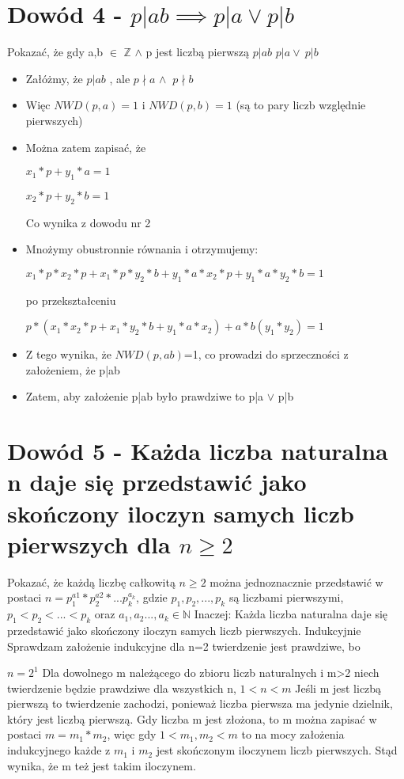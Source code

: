 \documentclass[a4paper, 12pt]{article}
\begin{document}
\section{Dowód 4 - \( p|ab\implies p|a \vee p|b \)}
Pokazać, że gdy a,b \( \in \) \(\mathbb{Z}\)
\( \wedge \) p jest liczbą pierwszą \( p|ab \) \implies \( p|a \vee\ p|b \)
\bigbreak
\begin{itemize}
	\item Załóżmy, że \( p|ab \) , ale \(p \nmid a\) \(\wedge\ \) \(p \nmid b\)
	\item Więc \(NWD(p,a)=1\) i \(NWD(p,b)=1 \) (są to pary liczb względnie pierwszych)
	\item Można zatem zapisać, że 
	
	\( x_{1}*p+ y_{1}*a=1 \)
	
	 \( x_{2}*p+y_{2}*b=1 \)
	 
	 Co wynika z dowodu nr 2
	 \item Mnożymy obustronnie równania i otrzymujemy:
	 
	 \(x_{1}*p*x_{2}*p+x_{1}*p*y_{2}*b+y_{1}*a*x_{2}*p+y_{1}*a*y_{2}*b=1 \)
	 
	 po przekształceniu
	
	 \( p*(x_{1}*x_{2}*p+x_{1}*y_{2}*b+y_{1}*a*x_{2})+ a*b(y_{1}*y_{2})=1\)
	 \item Z tego wynika, że \(NWD(p,ab) \)=1, co prowadzi do sprzeczności z założeniem, że p|ab
	 \item Zatem, aby założenie p|ab było prawdziwe to p|a \(\vee \) p|b 
\end{itemize}
\newpage
\section{Dowód 5 - Każda liczba naturalna n daje się przedstawić jako skończony iloczyn samych liczb pierwszych dla \(n \geq 2\) }
Pokazać, że każdą liczbę całkowitą \(n \geq 2\) można jednoznacznie przedstawić w postaci \(n= p_{1}^{a1}*p_{2}^{a2}*...p_{k}^{a_{k}}\), gdzie \(p_{1},p_{2},...,p_{k}\) są liczbami pierwszymi, \(p_{1}<p_{2}<...<p_{k}\) oraz \(a_{1},a_{2}...,a_{k} \in \mathbb{N}\) 
\bigbreak
Inaczej: Każda liczba naturalna daje się przedstawić jako skończony iloczyn samych liczb pierwszych.
\bigbreak
Indukcyjnie 
\bigbreak
Sprawdzam założenie indukcyjne dla n=2 twierdzenie jest prawdziwe, bo 

\(n=2^1\)
\bigbreak
Dla dowolnego m należącego do zbioru liczb naturalnych i m>2 niech twierdzenie będzie prawdziwe dla wszystkich n, \( 1<n<m \)
\bigbreak
Jeśli m jest liczbą pierwszą to twierdzenie zachodzi, ponieważ liczba pierwsza ma jedynie dzielnik, który jest liczbą pierwszą.
\bigbreak
Gdy liczba m jest złożona, to m można zapisać w postaci \(m=m_{1}*m_{2}\), więc gdy \(1<m_{1},m_{2}<m\) to na mocy założenia indukcyjnego każde z \(m_{1}\) i \(m_{2}\) jest skończonym iloczynem liczb pierwszych. Stąd wynika, że m też jest takim iloczynem.
\end{document}

